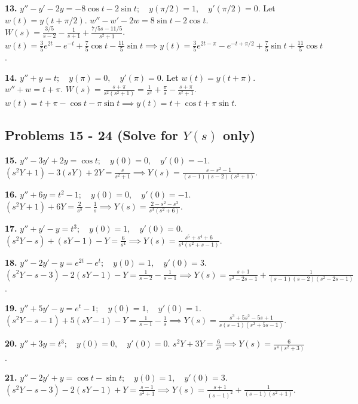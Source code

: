 \documentclass[11pt, letterpaper]{article}
\theoremstyle{definition}
\theoremstyle{remark}
\begin{document}
\textbf{13.} $y'' - y' - 2y = -8 \cos t - 2 \sin t ; \quad y(\pi/2) = 1 , \quad y'(\pi/2) = 0$. Let $w(t) = y(t + \pi/2)$. $w'' - w' - 2w = 8 \sin t - 2 \cos t$. $W(s) = \frac{3/5}{s - 2} - \frac{1}{s + 1} + \frac{7/5 s - 11/5}{s^2 + 1}$. $w(t) = \frac{3}{5}e^{2t} - e^{-t} + \frac{7}{5}\cos t - \frac{11}{5}\sin t \implies y(t) = \frac{3}{5}e^{2t - \pi} - e^{-t + \pi/2} + \frac{7}{5}\sin t + \frac{11}{5}\cos t$.

\textbf{14.} $y'' + y = t ; \quad y(\pi) = 0 , \quad y'(\pi) = 0$. Let $w(t) = y(t + \pi)$. $w'' + w = t + \pi$. $W(s) = \frac{s + \pi}{s^2(s^2 + 1)} = \frac{1}{s^2} + \frac{\pi}{s} - \frac{s + \pi}{s^2 + 1}$. $w(t) = t + \pi - \cos t - \pi \sin t \implies y(t) = t + \cos t + \pi \sin t$.

\subsection*{Problems 15 - 24 (Solve for $Y(s)$ only)}
\textbf{15.} $y'' - 3y' + 2y = \cos t ; \quad y(0) = 0 , \quad y'(0) = -1$.
$(s^2 Y + 1) - 3(sY) + 2Y = \frac{s}{s^2 + 1} \implies Y(s) = \frac{s - s^2 - 1}{(s - 1)(s - 2)(s^2 + 1)}$.

\textbf{16.} $y'' + 6y = t^2 - 1 ; \quad y(0) = 0 , \quad y'(0) = -1$.
$(s^2 Y + 1) + 6Y = \frac{2}{s^3} - \frac{1}{s} \implies Y(s) = \frac{2 - s^2 - s^3}{s^3(s^2 + 6)}$.

\textbf{17.} $y'' + y' - y = t^3 ; \quad y(0) = 1 , \quad y'(0) = 0$.
$(s^2 Y - s) + (sY - 1) - Y = \frac{6}{s^4} \implies Y(s) = \frac{s^5 + s^4 + 6}{s^4(s^2 + s - 1)}$.

\textbf{18.} $y'' - 2y' - y = e^{2t} - e^t ; \quad y(0) = 1 , \quad y'(0) = 3$.
$(s^2 Y - s - 3) - 2(sY - 1) - Y = \frac{1}{s - 2} - \frac{1}{s - 1} \implies Y(s) = \frac{s + 1}{s^2 - 2s - 1} + \frac{1}{(s - 1)(s - 2)(s^2 - 2s - 1)}$.

\textbf{19.} $y'' + 5y' - y = e^t - 1 ; \quad y(0) = 1 , \quad y'(0) = 1$.
$(s^2 Y - s - 1) + 5(sY - 1) - Y = \frac{1}{s - 1} - \frac{1}{s} \implies Y(s) = \frac{s^3 + 5s^2 - 5s + 1}{s(s - 1)(s^2 + 5s - 1)}$.

\textbf{20.} $y'' + 3y = t^3 ; \quad y(0) = 0 , \quad y'(0) = 0$.
$s^2 Y + 3Y = \frac{6}{s^4} \implies Y(s) = \frac{6}{s^4(s^2 + 3)}$.

\textbf{21.} $y'' - 2y' + y = \cos t - \sin t ; \quad y(0) = 1 , \quad y'(0) = 3$.
$(s^2 Y - s - 3) - 2(sY - 1) + Y = \frac{s - 1}{s^2 + 1} \implies Y(s) = \frac{s + 1}{(s - 1)^2} + \frac{1}{(s - 1)(s^2 + 1)}$.
\end{document}
